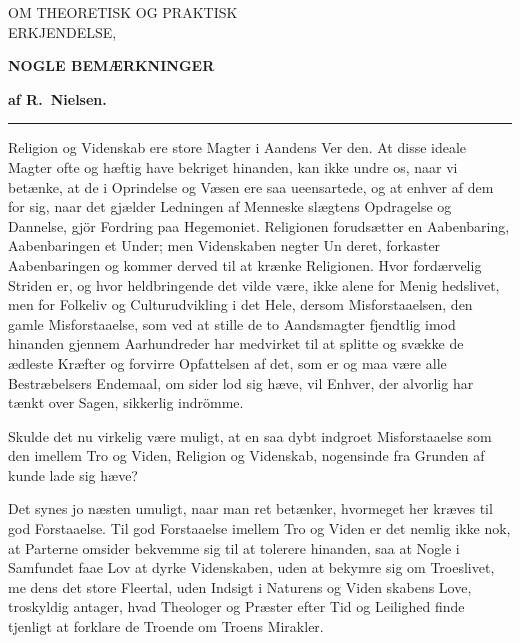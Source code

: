 \documentclass[12pt,a4paper]{article}
\newcommand{\opage}[1]{\marginnote{\footnotesize\textit{[#1]}}}
\begin{document}
\opage{63} %
\begin{center}
  {\large OM THEORETISK OG PRAKTISK\\
  ERKJENDELSE,}

  \smallskip
  {\small\textbf{NOGLE BEMÆRKNINGER}}

  \smallskip
  \textbf{af R.\ Nielsen.}
\end{center}

\begin{center}\rule{0.2\linewidth}{0.4pt}\end{center}
\medskip

Religion og Videnskab ere store Magter i Aandens Ver\-%
den. At disse ideale Magter ofte og hæftig have bekriget
hinanden, kan ikke undre os, naar vi betænke, at de i
Oprindelse og Væsen ere saa ueensartede, og at enhver af
dem for sig, naar det gjælder Ledningen af Menneske\-%
slægtens Opdragelse og Dannelse, gjör Fordring paa
Hegemoniet. Religionen forudsætter en Aabenbaring,
Aabenbaringen et Under; men Videnskaben negter Un\-%
deret, forkaster Aabenbaringen og kommer derved til at
krænke Religionen. Hvor fordærvelig Striden er, og
hvor heldbringende det vilde være, ikke alene for Menig\-%
hedslivet, men for Folkeliv og Culturudvikling i det Hele,
dersom Misforstaaelsen, den gamle Misforstaaelse, som
ved at stille de to Aandsmagter fjendtlig imod hinanden
gjennem Aarhundreder har medvirket til at splitte og
svække de ædleste Kræfter og forvirre Opfattelsen af det,
som er og maa være alle Bestræbelsers Endemaal, om\-%
sider lod sig hæve, vil Enhver, der alvorlig har tænkt
over Sagen, sikkerlig indrömme.

Skulde det nu virkelig være muligt, at en saa dybt
indgroet Misforstaaelse som den imellem Tro og Viden,
\opage{64}Religion og Videnskab, nogensinde fra Grunden af kunde
lade sig hæve?

Det synes jo næsten umuligt, naar man ret betænker,
hvormeget her kræves til god Forstaaelse. Til god
Forstaaelse imellem Tro og Viden er det nemlig ikke
nok, at Parterne omsider bekvemme sig til at tolerere
hinanden, saa at Nogle i Samfundet faae Lov at dyrke
Videnskaben, uden at bekymre sig om Troeslivet, me\-%
dens det store Fleertal, uden Indsigt i Naturens og Viden\-%
skabens Love, troskyldig antager, hvad Theologer og
Præster efter Tid og Leilighed finde tjenligt at forklare
de Troende om Troens Mirakler.
\end{document}
